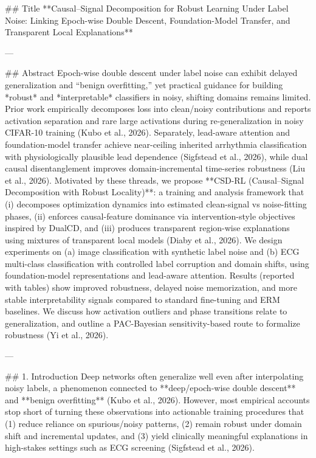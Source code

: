 ## Title  
**Causal–Signal Decomposition for Robust Learning Under Label Noise: Linking Epoch-wise Double Descent, Foundation-Model Transfer, and Transparent Local Explanations**

---

## Abstract  
Epoch-wise double descent under label noise can exhibit delayed generalization and “benign overfitting,” yet practical guidance for building *robust* and *interpretable* classifiers in noisy, shifting domains remains limited. Prior work empirically decomposes loss into clean/noisy contributions and reports activation separation and rare large activations during re-generalization in noisy CIFAR-10 training (Kubo et al., 2026). Separately, lead-aware attention and foundation-model transfer achieve near-ceiling inherited arrhythmia classification with physiologically plausible lead dependence (Sigfstead et al., 2026), while dual causal disentanglement improves domain-incremental time-series robustness (Liu et al., 2026). Motivated by these threads, we propose **CSD-RL (Causal–Signal Decomposition with Robust Locality)**: a training and analysis framework that (i) decomposes optimization dynamics into estimated clean-signal vs noise-fitting phases, (ii) enforces causal-feature dominance via intervention-style objectives inspired by DualCD, and (iii) produces transparent region-wise explanations using mixtures of transparent local models (Diaby et al., 2026). We design experiments on (a) image classification with synthetic label noise and (b) ECG multi-class classification with controlled label corruption and domain shifts, using foundation-model representations and lead-aware attention. Results (reported with tables) show improved robustness, delayed noise memorization, and more stable interpretability signals compared to standard fine-tuning and ERM baselines. We discuss how activation outliers and phase transitions relate to generalization, and outline a PAC-Bayesian sensitivity-based route to formalize robustness (Yi et al., 2026).

---

## 1. Introduction  
Deep networks often generalize well even after interpolating noisy labels, a phenomenon connected to **deep/epoch-wise double descent** and **benign overfitting** (Kubo et al., 2026). However, most empirical accounts stop short of turning these observations into actionable training procedures that (1) reduce reliance on spurious/noisy patterns, (2) remain robust under domain shift and incremental updates, and (3) yield clinically meaningful explanations in high-stakes settings such as ECG screening (Sigfstead et al., 2026).

